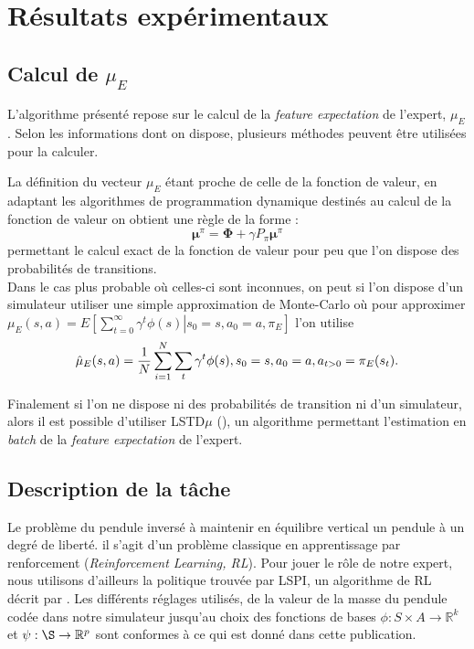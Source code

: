 \documentclass[publibook-draft]{CAp2012}
\begin{document}
\section{Résultats expérimentaux}
\subsection{Calcul de $\mu_E$}
L'algorithme présenté repose sur le calcul de la {\it feature expectation} de l'expert, $\mu_E$. Selon les informations dont on dispose, plusieurs méthodes peuvent être utilisées pour la calculer.

La définition du vecteur $\mu_E$ étant proche de celle de la fonction de valeur, en adaptant les algorithmes de programmation dynamique destinés au calcul de la fonction de valeur on obtient une règle de la forme :
\begin{equation}
\mathbf \mu^\pi = \mathbf\Phi + \gamma P_\pi\mathbf\mu^\pi
\end{equation}
permettant le calcul exact de la fonction de valeur pour peu que l'on dispose des probabilités de transitions.\\

Dans le cas plus probable où celles-ci sont inconnues, on peut si l'on dispose d'un simulateur utiliser une simple approximation de Monte-Carlo où pour approximer $\mu_E(s,a) = E\left.\left[\sum\limits_{t=0}^\infty \gamma^t \phi(s)\right|s_0 = s, a_0 = a, \pi_E\right]$ l'on utilise 
\begin{equation}
\hat\mu_E(s,a) = {1\over N}\sum\limits_{i=1}^{N}\sum\limits_{t}\gamma^t\phi(s), s_0=s, a_0=a, a_{t>0} = \pi_E(s_t).
\end{equation}

Finalement si l'on ne dispose ni des probabilités de transition ni d'un simulateur, alors il est possible d'utiliser LSTD$\mu$ (\citep{klein2011batch}), un algorithme permettant l'estimation en {\it batch} de la {\it feature expectation} de l'expert.
\subsection{Description de la tâche}
Le problème du pendule inversé à maintenir en équilibre vertical un pendule à un degré de liberté. il s'agit d'un problème classique en apprentissage par renforcement ({\it Reinforcement Learning, RL}). Pour jouer le rôle de notre expert, nous utilisons d'ailleurs la politique trouvée par LSPI, un algorithme de RL décrit par \citet{lagoudakis2003least}. Les différents réglages utilisés, de la valeur de la masse du pendule codée dans notre simulateur jusqu'au choix des fonctions de bases $\phi : S\times A \rightarrow \mathbb{R}^k$ et $\psi : \S \rightarrow \mathbb{R}^p$ sont conformes à ce qui est donné dans cette publication.\\
\end{document}
